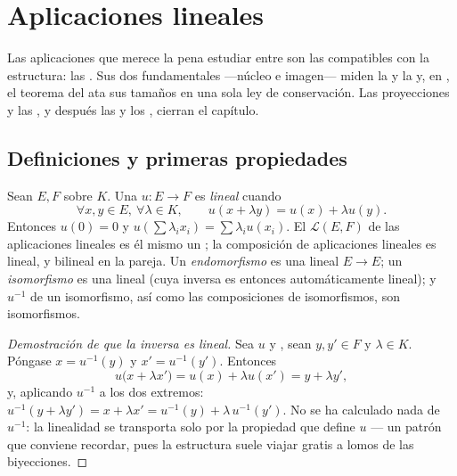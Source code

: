 \chapter{Aplicaciones lineales}\label{ch:b1:linmaps}

Las aplicaciones que merece la pena estudiar entre  son las compatibles con la estructura: las
\emph{}. Sus dos  fundamentales
---núcleo e imagen--- miden la  y la 
y, en , el teorema del  ata sus tamaños en una
sola ley de conservación. Las proyecciones y las , y después
las  y los , cierran el capítulo.

\section{Definiciones y primeras propiedades}

\begin{definition}\label{def:b1:linmaps:def}
Sean $E, F$  sobre $K$. Una 
$u \colon E \to F$ es \emph{lineal} cuando
\[
\forall x, y \in E,\ \forall \lambda \in K, \qquad
u(x + \lambda y) = u(x) + \lambda u(y).
\]
Entonces $u(0) = 0$ y
$u(\sum \lambda_i x_i) = \sum \lambda_i u(x_i)$. El 
$\mathcal{L}(E, F)$ de las aplicaciones lineales es él mismo un
; la composición de aplicaciones lineales es
lineal, y bilineal en la pareja. Un \emph{endomorfismo} es una
 lineal $E \to E$; un \emph{isomorfismo} es una
 lineal  (cuya inversa es entonces
automáticamente lineal); y $u^{-1}$ de un isomorfismo, así como las
composiciones de isomorfismos, son isomorfismos.
\end{definition}

\begin{proof}[Demostración de que la inversa es lineal]
Sea $u$  y , sean $y, y' \in F$ y $\lambda \in K$.
Póngase $x = u^{-1}(y)$ y $x' = u^{-1}(y')$. Entonces
\[
u\bigl(x + \lambda x'\bigr) = u(x) + \lambda u(x')
= y + \lambda y' ,
\]
y, aplicando $u^{-1}$ a los dos extremos:
$u^{-1}(y + \lambda y') = x + \lambda x' = u^{-1}(y) +
\lambda\,u^{-1}(y')$. No se ha calculado nada de $u^{-1}$: la
linealidad se transporta solo por la propiedad que define $u$ --- un
patrón que conviene recordar, pues la estructura suele viajar gratis
a lomos de las biyecciones.
\end{proof}

